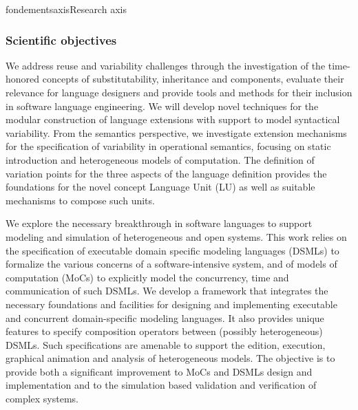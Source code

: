 \documentclass{ra2018}
\begin{document}
\begin{module}{fondements}{axis}{Research axis}
\subsubsection*{Scientific objectives} 

We address reuse and variability challenges through the investigation of the time-honored concepts of substitutability, inheritance and components, evaluate their relevance for language designers and provide tools and methods for their inclusion in software language engineering.
We will develop novel techniques for the modular construction of language extensions with support to model syntactical variability. From the semantics perspective, we investigate extension mechanisms for the specification of variability in  operational semantics, focusing on static introduction and heterogeneous models of computation. The definition of variation points for the three aspects of the language definition provides the foundations for the novel concept Language Unit (LU) as well as suitable mechanisms to compose such units.


We explore the necessary breakthrough in software languages to support modeling and simulation of heterogeneous and open systems. This work relies on the specification of executable domain specific modeling languages (DSMLs) to formalize the various concerns of a software-intensive system, and of models of computation (MoCs) to explicitly model the concurrency, time and communication of such DSMLs. We develop a framework that integrates the necessary foundations and facilities for designing and
implementing executable and concurrent domain-specific modeling languages. It also provides unique features to specify composition operators between (possibly heterogeneous) DSMLs. Such specifications are amenable to support the edition, execution, graphical animation and analysis of heterogeneous models. The objective is to provide both a significant improvement to MoCs and DSMLs design and implementation and to the simulation based validation and verification of complex systems.



\end{module}
\end{document}
